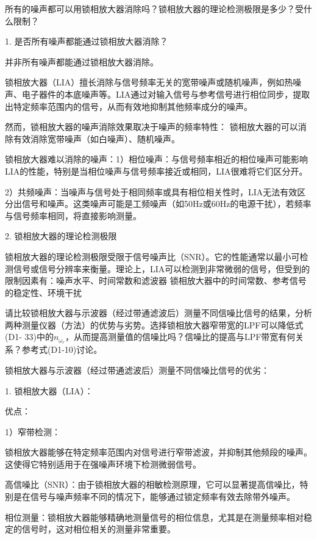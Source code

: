 \documentclass[dvipsnames, svgnames,a4paper,11pt]{article}
\begin{document}
	\begin{question}
		所有的噪声都可以用锁相放大器消除吗？锁相放大器的理论检测极限是多少？受什么限制？
	\end{question}
	1. 是否所有噪声都能通过锁相放大器消除？

	并非所有噪声都能通过锁相放大器消除。

	锁相放大器（LIA）擅长消除与信号频率无关的宽带噪声或随机噪声，例如热噪声、电子器件的本底噪声等。LIA通过对输入信号与参考信号进行相位同步，提取出特定频率范围内的信号，从而有效地抑制其他频率成分的噪声。

	然而，锁相放大器的噪声消除效果取决于噪声的频率特性：
	锁相放大器的可以消除有效消除宽带噪声（如白噪声）、随机噪声。

	锁相放大器难以消除的噪声：1）相位噪声：与信号频率相近的相位噪声可能影响LIA的性能，特别是当相位噪声与信号频率接近或相同，LIA很难将它们区分开。
	
	2）共频噪声：当噪声与信号处于相同频率或具有相位相关性时，LIA无法有效区分出信号和噪声。这类噪声可能是工频噪声（如50Hz或60Hz的电源干扰），若频率与信号频率相同，将直接影响测量。

	2. 锁相放大器的理论检测极限

	锁相放大器的理论检测极限受限于信号噪声比（SNR）。它的性能通常以最小可检测信号或信号分辨率来衡量。理论上，LIA可以检测到非常微弱的信号，但受到的限制因素有：噪声水平、时间常数和滤波器
	锁相放大器中的时间常数、参考信号的稳定性、环境干扰

	\begin{question}
		请比较锁相放大器与示波器（经过带通滤波后）测量不同信噪比信号的结果，分析两种测量仪器（方法）的优势与劣势。选择锁相放大器窄带宽的LPF可以降低式(D1- 33)中的$n _{\omega_r}$，从而提高测量值的信噪比吗？信噪比的提高与LPF带宽有何关系？参考式(D1-10)讨论。
	\end{question}
	锁相放大器与示波器（经过带通滤波后）测量不同信噪比信号的优劣：

	1. 锁相放大器（LIA）：
	
	优点：

	1）窄带检测：
	
	锁相放大器能够在特定频率范围内对信号进行窄带滤波，并抑制其他频段的噪声。这使得它特别适用于在强噪声环境下检测微弱信号。

	高信噪比（SNR）：由于锁相放大器的相敏检测原理，它可以显著提高信噪比，特别是在信号与噪声频率不同的情况下，能够通过锁定频率有效去除带外噪声。

	相位测量：锁相放大器能够精确地测量信号的相位信息，尤其是在测量频率相对稳定的信号时，这对相位相关的测量非常重要。
	
\end{document}
